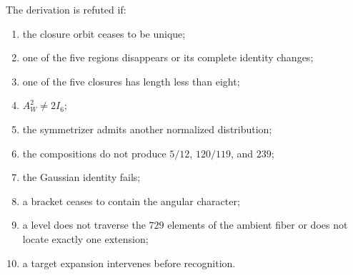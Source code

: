 \begin{criterion}
The derivation is refuted if:
\begin{enumerate}
 \item the closure orbit ceases to be unique;
 \item one of the five regions disappears or its complete identity changes;
 \item one of the five closures has length less than eight;
 \item \(A_W^2\ne2I_6\);
 \item the symmetrizer admits another normalized distribution;
 \item the compositions do not produce \(5/12\), \(120/119\), and \(239\);
 \item the Gaussian identity fails;
 \item a bracket ceases to contain the angular character;
 \item a level does not traverse the \(729\) elements of the ambient fiber or does not
       locate exactly one extension;
 \item a target expansion intervenes before recognition.
\end{enumerate}
\end{criterion}
